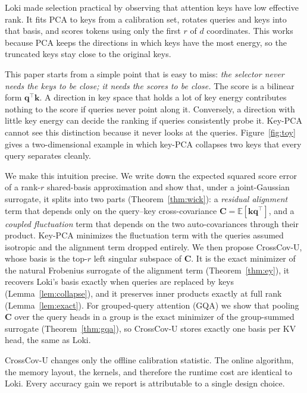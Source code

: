\documentclass[10pt]{article}
\newcommand{\E}{\mathbb{E}}
\newcommand{\bq}{\mathbf{q}}
\newcommand{\bk}{\mathbf{k}}
\newcommand{\bC}{\mathbf{C}}
\newcommand{\method}{CrossCov-U}
\theoremstyle{plain}
\theoremstyle{definition}
\theoremstyle{remark}
\begin{document}
Loki \citep{loki} made selection practical by observing that attention keys
have low effective rank. It fits PCA to keys from a calibration set, rotates
queries and keys into that basis, and scores tokens using only the first $r$
of $d$ coordinates. This works because PCA keeps the directions in which keys
have the most energy, so the truncated keys stay close to the original keys.

This paper starts from a simple point that is easy to miss:
\emph{the selector never needs the keys to be close; it needs the scores to be
close.} The score is a bilinear form $\bq^\top\bk$. A direction in key space
that holds a lot of key energy contributes nothing to the score if queries
never point along it. Conversely, a direction with little key energy can
decide the ranking if queries consistently probe it. Key-PCA cannot see this
distinction because it never looks at the queries. Figure~\ref{fig:toy} gives
a two-dimensional example in which key-PCA collapses two keys that every
query separates cleanly.

We make this intuition precise. We write down the expected squared score error
of a rank-$r$ shared-basis approximation and show that, under a joint-Gaussian
surrogate, it splits into two parts (Theorem~\ref{thm:wick}): a
\emph{residual alignment} term that depends only on the query--key
cross-covariance $\bC=\E[\bk\bq^\top]$, and a \emph{coupled fluctuation} term
that depends on the two auto-covariances through their product. Key-PCA
minimizes the fluctuation term with the queries assumed isotropic and the
alignment term dropped entirely. We then propose \method{}, whose basis is the
top-$r$ left singular subspace of $\bC$. It is the exact minimizer of the
natural Frobenius surrogate of the alignment term (Theorem~\ref{thm:ey}), it
recovers Loki's basis exactly when queries are replaced by keys
(Lemma~\ref{lem:collapse}), and it preserves inner products exactly at full
rank (Lemma~\ref{lem:exact}). For grouped-query attention (GQA) we show that
pooling $\bC$ over the query heads in a group is the exact minimizer of the
group-summed surrogate (Theorem~\ref{thm:gqa}), so \method{} stores exactly one
basis per KV head, the same as Loki.

\method{} changes only the offline calibration statistic. The online algorithm,
the memory layout, the kernels, and therefore the runtime cost are identical
to Loki. Every accuracy gain we report is attributable to a single design
choice.
\end{document}
